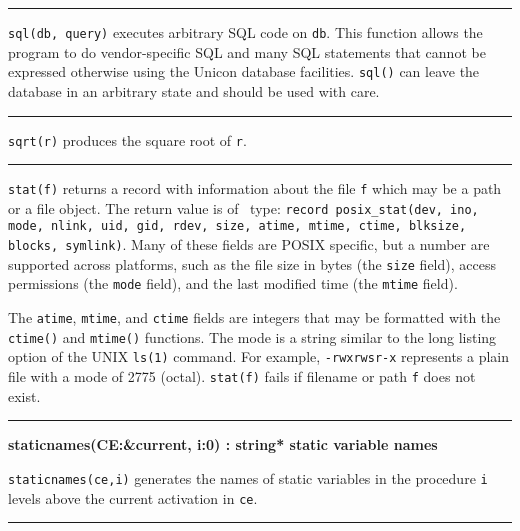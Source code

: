 \bigskip\hrule\vspace{0.1cm}

\noindent
{}\texttt{sql(db, query)} executes arbitrary SQL code on
\texttt{db}. This function allows the program to do vendor-specific SQL
and many SQL statements that cannot be expressed otherwise using the
Unicon database facilities. \texttt{sql()} can leave the database in an
arbitrary state and should be used with care.

\bigskip\hrule\vspace{0.1cm}

\noindent
{}\texttt{sqrt(r)} produces the square root of
\texttt{r}.

\bigskip\hrule\vspace{0.1cm}

\noindent
{}\texttt{stat(f)} returns a record
with information about the file \texttt{f} which may be a path or a
file object. The return value is of \ type: \texttt{record
posix\_stat(dev, ino, mode, nlink, uid, gid, rdev, size, atime, mtime,
ctime, blksize, blocks, symlink)}. Many of these fields are POSIX
specific, but a number are supported across platforms, such as the
file size in bytes (the \texttt{size} field), access
permissions (the \texttt{mode} field), and the last modified time (the
\texttt{mtime} field).

The \texttt{atime}, \texttt{mtime}, and \texttt{ctime} fields are
integers that may be formatted with the \texttt{ctime()} and
\texttt{mtime()} functions. The mode is a string similar to the long
listing option of the UNIX \texttt{ls(1)} command. For example,
\texttt{{\textquotedbl}-rwxrwsr-x{\textquotedbl}} represents a plain
file with a mode of 2775 (octal). \texttt{stat(f)} fails if filename or
path \texttt{f} does not exist.

\bigskip\hrule\vspace{0.1cm}
\noindent
{\bf staticnames(CE:\&current, i:0) : string* \hfill static variable names}

\noindent
{}\texttt{staticnames(ce,i)} generates the names of static
variables in the procedure \texttt{i} levels above the current
activation in \texttt{ce}.

\bigskip\hrule\vspace{0.1cm}

